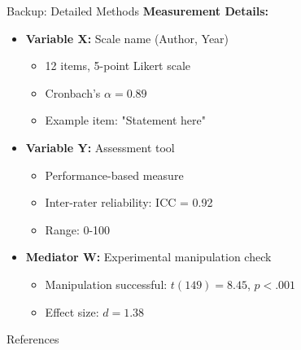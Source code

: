 \documentclass[aspectratio=169,11pt]{beamer}
\begin{document}
\begin{frame}{Backup: Detailed Methods}
  \textbf{Measurement Details:}
  \begin{itemize}
    \item \textbf{Variable X:} Scale name (Author, Year)
    \begin{itemize}
      \item 12 items, 5-point Likert scale
      \item Cronbach's $\alpha = 0.89$
      \item Example item: "Statement here"
    \end{itemize}
    
    \item \textbf{Variable Y:} Assessment tool
    \begin{itemize}
      \item Performance-based measure
      \item Inter-rater reliability: ICC = 0.92
      \item Range: 0-100
    \end{itemize}
    
    \item \textbf{Mediator W:} Experimental manipulation check
    \begin{itemize}
      \item Manipulation successful: $t(149) = 8.45$, $p < .001$
      \item Effect size: $d = 1.38$
    \end{itemize}
  \end{itemize}
\end{frame}


\begin{frame}[allowframebreaks]{References}
  \printbibliography
\end{frame}
\end{document}
